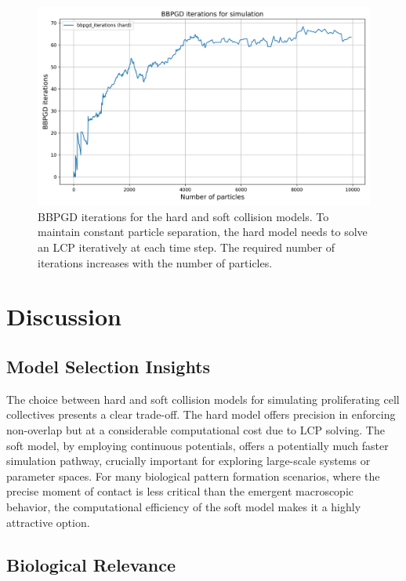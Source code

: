 \documentclass[conference]{IEEEtran}
\begin{document}
\begin{figure}
    \centering
    \includegraphics[width=\linewidth]{figures/comparisons/bbpgd_iterations_simulation.png}
    \caption{BBPGD iterations for the hard and soft collision models. To maintain constant particle separation, the hard model needs to solve an LCP iteratively at each time step. The required number of iterations increases with the number of particles.}
    \label{figure:bbpgd_iterations_simulation}
\end{figure}

\newpage
\section{Discussion}
\subsection{Model Selection Insights}


The choice between hard and soft collision models for simulating proliferating cell collectives presents a clear trade-off. The hard model offers precision in enforcing non-overlap but at a considerable computational cost due to LCP solving. The soft model, by employing continuous potentials, offers a potentially much faster simulation pathway, crucially important for exploring large-scale systems or parameter spaces. For many biological pattern formation scenarios, where the precise moment of contact is less critical than the emergent macroscopic behavior, the computational efficiency of the soft model makes it a highly attractive option.

\subsection{Biological Relevance}
\end{document}
